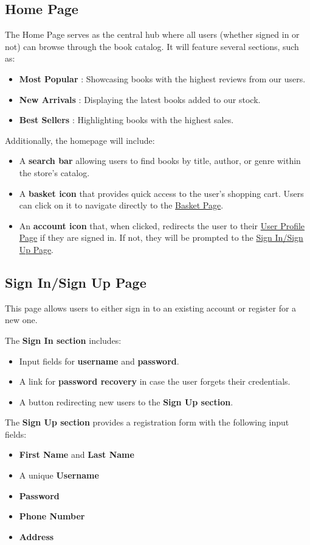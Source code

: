 \subsection{Home Page}
The Home Page serves as the central hub where all users (whether signed in or not) can browse through the book catalog. It will feature several sections, such as:
\begin{itemize}
    \item \textbf{Most Popular} : Showcasing books with the highest reviews from our users.
    \item \textbf{New Arrivals} : Displaying the latest books added to our stock.
    \item \textbf{Best Sellers} : Highlighting books with the highest sales.
\end{itemize}
Additionally, the homepage will include:
\begin{itemize}
    \item A \textbf{search bar} allowing users to find books by title, author, or genre within the store's catalog.
    \item A \textbf{basket icon} that provides quick access to the user's shopping cart. Users can click on it to navigate directly to the \hyperref[sec:basket]{Basket Page}.
    \item An \textbf{account icon} that, when clicked, redirects the user to their \hyperref[sec:profile]{User Profile Page} if they are signed in. If not, they will be prompted to the \hyperref[sec:signin]{Sign In/Sign Up Page}.
\end{itemize}


\subsection{Sign In/Sign Up Page} \label{sec:signin}
This page allows users to either sign in to an existing account or register for a new one.

The \textbf{Sign In section} includes:
\begin{itemize}
    \item Input fields for \textbf{username} and \textbf{password}.
    \item A link for \textbf{password recovery} in case the user forgets their credentials.
    \item A button redirecting new users to the \textbf{Sign Up section}.
\end{itemize}

The \textbf{Sign Up section} provides a registration form with the following input fields:
\begin{itemize}
    \item \textbf{First Name} and \textbf{Last Name}
    \item A unique \textbf{Username}
    \item \textbf{Password}
    \item \textbf{Phone Number}
    \item \textbf{Address}
\end{itemize}



